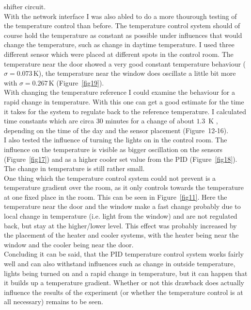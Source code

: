 \documentclass[12pt]{scrartcl}
\begin{document}
    shifter circuit.\\
    With the network interface I was also abled to do a more thourough testing
    of the temperature control than before. The temperature control system
    should of course hold the temperature as constant as possible under
    influences that would change the temperature, such as change in daytime
    temperature. I used three different sensor which were placed at different
    spots in the control room. The temperature near the door showed a very
    good constant temperature behaviour ($\sigma = 0.073\,\text{K}$), the
    temperature near the window does oscillate a little bit more with
    $\sigma = 0.267\,\text{K}$ (Figure~\ref{fig19}). \\
    With changing the temperature reference I could examine the behaviour for a
    rapid change in temperature. With this one can get a good estimate for the
    time it takes for the system to regulate back to the reference temperature.
    I calculated time constants which are circa 30 minutes for a change of
    about $1.3$~K , depending on the time of the day and the sensor placement
    (Figure~12-16).\\
    I also tested the influence of turning the lights on in the control room.
    The influence on the temperature is visible as bigger oscillation on the
    sensors (Figure~\ref{fig17}) and as a higher cooler set value from the PID
    (Figure~\ref{fig18}). The change in temperature is still rather small.\\
    One thing which the temperature control system could not prevent is a temperature
    gradient over the room, as it only controls towards the temperature at one
    fixed place in the room. This can be seen in Figure~\ref{fig11}. Here the
    temperature near the door and the window make a fast change probably due to
    local change in temperature (i.e. light from the window) and are not regulated
    back, but stay at the higher/lower level. This effect was probably increased
    by the placement of the heater and cooler systems, with the heater being
    near the window and the cooler being near the door.\\
    Concluding it can be said, that the PID temperature control system works
    fairly well and can also withstand influences such as change in outside
    temperature, lights being turned on and a rapid change in temperature, but
    it can happen that it builds up a temperature gradient. Whether or not this
    drawback does actually influence the results of the experiment (or whether the temperature control is at all
    necessary) remains to be seen.
\end{document}
